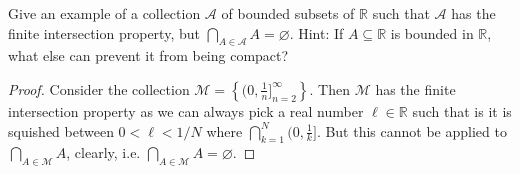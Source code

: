 \documentclass[10pt,reqno]{amsart}
\theoremstyle{definition}
\newcommand{\rr}{\mathbb R}
\begin{document}
\begin{tcolorbox}[colback=black!5!white,colframe=black!75!black,title= Chapter 4: Exercise $4.2.$] Give an example of a collection $\mathcal A$ of bounded subsets of $\rr$ such that $\mathcal A$ has the finite intersection property, but $\bigcap_{A \in \mathcal A} A  = \varnothing$. Hint: If $A \subseteq \rr$ is bounded in $\rr$, what else can prevent it from being compact?
\tcblower 
\begin{proof} Consider the  collection $\mathcal M = \left \{ (0,\frac{1}{n}]_{n=2}^\infty \right \}$. Then $\mathcal M$ has the finite intersection property as we can always pick a real number  $\ell \in \rr$ such that is it is squished between $0 < \ell < 1/N$ where $\bigcap_{k=1}^N (0, \frac{1}{k} ]$. But this cannot be applied to $\bigcap_{A \in \mathcal M} A$, clearly, i.e. $\bigcap_{A \in \mathcal M} A = \varnothing$. 
\end{proof} 

\end{tcolorbox}
\end{document}
